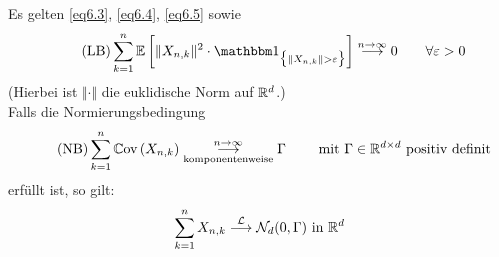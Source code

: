 \begin{satz}\label{satz6.2MultivariaterZGWS}\enter
	Es gelten \eqref{eq6.3}, \eqref{eq6.4}, \eqref{eq6.5} sowie
	\begin{align}\label{eqSatz6.2LB}\tag{LB}
		\sum\limits_{k=1}^n\E\left[\Vert X_{n,k}\Vert^2\cdot\indi_{\big\lbrace\Vert X_{n,k}\Vert>\varepsilon\big\rbrace}\right]\stackrel{n\to\infty}{\longrightarrow}0\qquad\forall\varepsilon>0
	\end{align}
	(Hierbei ist $\Vert\cdot\Vert$ die euklidische Norm auf $\mathbb{R}^d$.)\\
	Falls die Normierungsbedingung
	\begin{align}\label{eqSatz6.2NB}\tag{NB}
		\sum\limits_{k=1}^n\mathbb{C}\text{ov}\left(X_{n,k}\right)\underset{\text{komponentenweise}}{\overset{n\to\infty}{\longrightarrow}}\Gamma\qquad\text{ mit }\Gamma\in\mathbb{R}^{d\times d}\text{ positiv definit}
	\end{align}
	erfüllt ist, so gilt:
	\begin{align*}
		\sum\limits_{k=1}^n X_{n,k}\stackrel{\mathcal{L}}{\longrightarrow}\mathcal{N}_d(0,\Gamma)\text{ in }\mathbb{R}^d
	\end{align*}
\end{satz}
